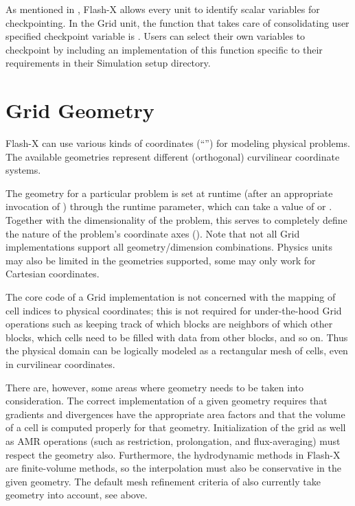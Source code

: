 \begin{flashtip}
As mentioned in , Flash-X allows every unit
to identify scalar variables for checkpointing. In the \unit{Grid} unit, the
function that takes care of consolidating user specified checkpoint
variable is . Users can select their own
variables to checkpoint by including an implementation of this
function specific to their requirements in their Simulation setup directory.
\end{flashtip}




 

\section{Grid Geometry}
\label{Sec:Grid geometry}

Flash-X can use various kinds of coordinates (``'')
for modeling physical problems. The available geometries
represent different (orthogonal) curvilinear coordinate systems.

The geometry for a particular problem is set at runtime
(after an appropriate invocation of )
through
the  runtime parameter, which can take a value of
 or . Together
with the dimensionality of the problem, this serves to completely
define the nature of the problem's coordinate axes
(). Note that not all \unit{Grid} implementations
support all geometry/dimension combinations.
Physics units may also be limited in the geometries supported,
some may only work for Cartesian coordinates.

The core code of a \unit{Grid} implementation is not concerned with
the mapping of cell indices to physical coordinates; this is not required
for under-the-hood \unit{Grid} operations such as keeping track of which blocks
are neighbors of which other blocks, which cells need to be filled with data
from other blocks, and so on. Thus the physical domain can be logically modeled as
a rectangular mesh of cells, even in curvilinear coordinates.

There are, however, some areas where geometry needs to be taken into consideration.
The correct implementation of a given geometry%
requires that gradients and divergences have the appropriate area factors
and that the volume of a cell is computed properly for that geometry.
Initialization of the grid as well as AMR operations (such as restriction,
prolongation, and flux-averaging) must respect the geometry also.
Furthermore,
the hydrodynamic methods in Flash-X are finite-volume methods, so the
interpolation%
must also be conservative in the given geometry.
The default mesh refinement criteria of \flashx also currently
take geometry into account, see  above.

